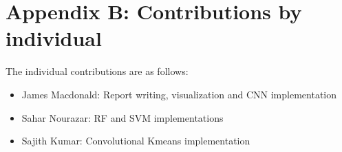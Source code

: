 \documentclass[12pt]{article}
\begin{document}
\section{Appendix B: Contributions by individual}
The individual contributions are as follows:
\begin{itemize}
  \item James Macdonald: Report writing, visualization and CNN implementation
  \item Sahar Nourazar: RF and SVM implementations
  \item Sajith Kumar: Convolutional Kmeans implementation
\end{itemize}


\newpage
\renewcommand\refname{Bibliography}



\end{document}

